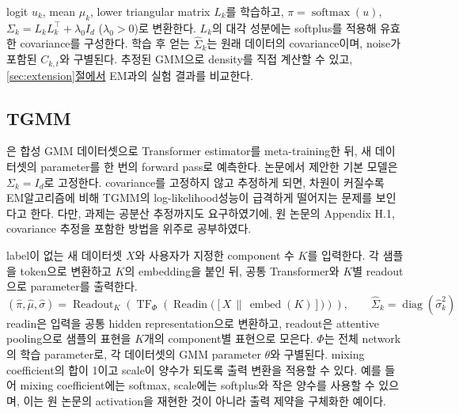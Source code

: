 \documentclass[a4paper,11pt]{article}
\DeclareRobustCommand{\seclink}[3]{\hyperref[#2]{\ref*{#1}#3}\hspace{0pt}}
\DeclareRobustCommand{\secref}[2]{\seclink{#1}{#1}{#2}}
\newcommand{\diag}{\operatorname{diag}}
\newcommand{\softmax}{\operatorname{softmax}}
\numberwithin{equation}{section}
\begin{document}
logit $u_k$, mean $\mu_k$, lower triangular matrix $L_k$를 학습하고,
$\pi=\softmax(u)$, $\Sigma_k=L_kL_k^\top+\lambda_0I_d$ ($\lambda_0>0$)로 변환한다.
$L_k$의 대각 성분에는 softplus를 적용해 유효한 covariance를 구성한다.
학습 후 얻는 $\widehat\Sigma_k$는 원래 데이터의 covariance이며, noise가 포함된 $C_{k,t}$와 구별된다.
추정된 GMM으로 density를 직접 계산할 수 있고, \secref{sec:extension}{절에서} EM과의 실험 결과를 비교한다.

\begin{center}
\label{fig:dsm}
\end{center}

\subsection{TGMM}
\label{sec:tgmm}
\citet{tgmm2026}은
합성 GMM 데이터셋으로 Transformer estimator를 meta-training한 뒤,
새 데이터셋의 parameter를 한 번의 forward pass로 예측한다.
논문에서 제안한 기본 모델은 $\Sigma_k=I_d$로 고정한다. covariance를 고정하지 않고 추정하게 되면, 차원이 커질수록 EM알고리즘에 비해 TGMM의 log-likelihood성능이 급격하게 떨어지는 문제를 보인다고 한다. 다만, 과제는 공분산 추정까지도 요구하였기에, 원 논문의 Appendix H.1, covariance 추정을 포함한 방법을 위주로 공부하였다.

label이 없는 새 데이터셋 $X$와 사용자가 지정한 component 수 $K$를 입력한다.
각 샘플을 token으로 변환하고 $K$의 embedding을 붙인 뒤, 공통 Transformer와 $K$별 readout으로 parameter를 출력한다.
\begin{equation}
 (\widehat\pi,\widehat\mu,\widehat\sigma)
 =\operatorname{Readout}_{K}\!\left(
 \operatorname{TF}_{\Phi}\!\left(
 \operatorname{Readin}\bigl([X\,\|\,\operatorname{embed}(K)]\bigr)\right)\right),
 \qquad \widehat\Sigma_k=\diag(\widehat\sigma_k^2)
 \label{eq:tgmm}
\end{equation}
readin은 입력을 공통 hidden representation으로 변환하고,
readout은 attentive pooling으로 샘플의 표현을 $K$개의 component별 표현으로 모은다.
$\Phi$는 전체 network의 학습 parameter로, 각 데이터셋의 GMM parameter $\theta$와 구별된다.
mixing coefficient의 합이 1이고 scale이 양수가 되도록 출력 변환을 적용할 수 있다.
예를 들어 mixing coefficient에는 softmax, scale에는 softplus와 작은 양수를 사용할 수 있으며,
이는 원 논문의 activation을 재현한 것이 아니라 출력 제약을 구체화한 예이다.
\end{document}
